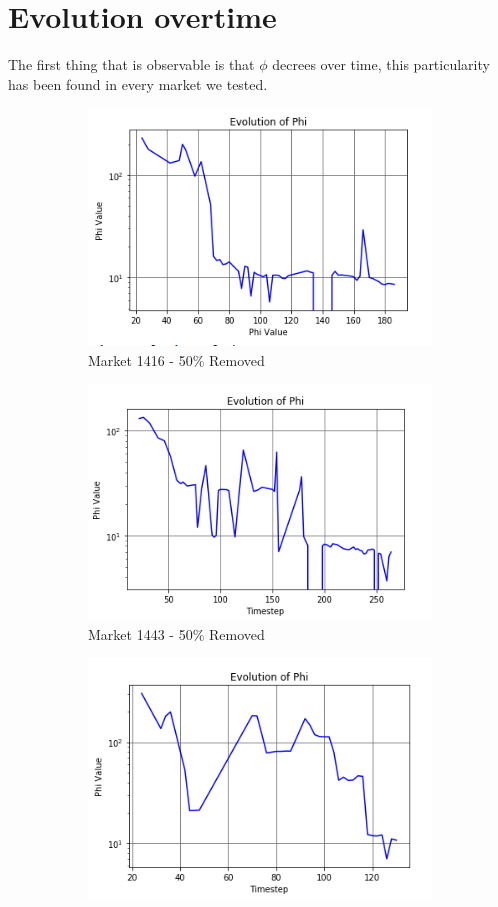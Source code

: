 \documentclass{report}
\begin{document}
\section{Evolution overtime}

The first thing that is observable is that $\phi $ decrees over time, this particularity has been found in every market we tested.

\begin{figure}[ht] 
  \begin{subfigure}[b]{0.5\linewidth}
    \centering
    \includegraphics[width=0.75\linewidth]{./Graphs/PhiEv-Market-1416-0.5-Removed} 
    \caption{Market 1416 - 50\% Removed} 
    \label{fig1:a} 
    \vspace{4ex}
  \end{subfigure}%
  \begin{subfigure}[b]{0.5\linewidth}
    \centering
    \includegraphics[width=0.75\linewidth]{./Graphs/PhiEv-Market-1443-0.5-Removed} 
    \caption{Market 1443 - 50\% Removed} 
    \label{fig1:b} 
    \vspace{4ex}
  \end{subfigure} 
  \begin{subfigure}[b]{0.5\linewidth}
    \centering
    \includegraphics[width=0.75\linewidth]{./Graphs/PhiEv-Market-1413-0.4-Removed} 

\end{subfigure}
\end{figure}
\end{document}
